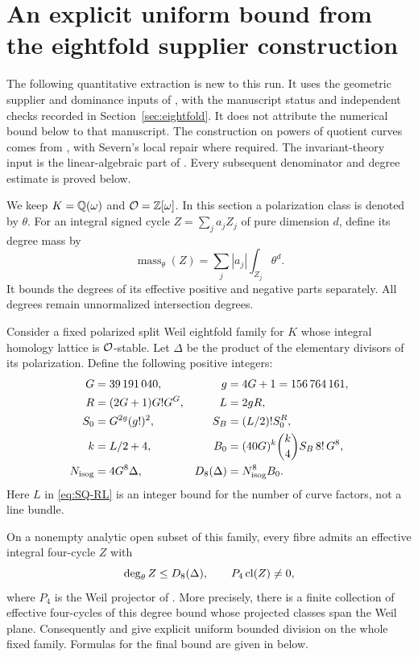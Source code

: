 \section{An explicit uniform bound from the eightfold supplier construction}
\label{sec:eightfold-quantitative}

The following quantitative extraction is new to this run. It uses the geometric supplier and dominance inputs of \citet{Severn26}, with the manuscript status and independent checks recorded in Section~\ref{sec:eightfold}. It does not attribute the numerical bound below to that manuscript. The construction on powers of quotient curves comes from \citet[Theorem~2.0 and Lemmas~2.3--2.6]{Schoen88}, with Severn's local repair where required. The invariant-theory input is the linear-algebraic part of \citet[Lemma~3.5, Proposition~3.6, and Remark~3.7]{Milne99}. Every subsequent denominator and degree estimate is proved below.

We keep $K=\mathbb Q(\omega)$ and $\mathcal O=\mathbb Z[\omega]$. In this section a polarization class is denoted by $\theta$. For an integral signed cycle $Z=\sum_j a_jZ_j$ of pure dimension $d$, define its degree mass by
\[
 \operatorname{mass}_\theta(Z)=\sum_j|a_j|\int_{Z_j}\theta^d.
\]
It bounds the degrees of its effective positive and negative parts separately. All degrees remain unnormalized intersection degrees.

\begin{theorem}\label{SQ1}
Consider a fixed polarized split Weil eightfold family for $K$ whose integral homology lattice is $\mathcal O$-stable. Let $\Delta$ be the product of the elementary divisors of its polarization. Define the following positive integers:
\begin{align}
 G&=39\,191\,040, & g&=4G+1=156\,764\,161,\label{eq:SQ-Gg}\\
 R&=(2G+1)G!G^G, & L&=2gR,\label{eq:SQ-RL}\\
 S_0&=G^{2g}(g!)^2, & S_B&=(L/2)!S_0^R,\label{eq:SQ-S}\\
 k&=L/2+4, & B_0&=(40G)^k\binom{k}{4}S_B\,8!\,G^8,\label{eq:SQ-B}\\
 N_{\rm isog}&=4G^8\Delta, & D_8(\Delta)&=N_{\rm isog}^{8}B_0.\label{eq:SQ-D}
\end{align}
Here $L$ in \eqref{eq:SQ-RL} is an integer bound for the number of curve factors, not a line bundle.

On a nonempty analytic open subset of this family, every fibre admits an effective integral four-cycle $Z$ with
\[
 \deg_\theta Z\le D_8(\Delta),\qquad P_4\operatorname{cl}(Z)\ne0,
\]
where $P_4$ is the Weil projector of . More precisely, there is a finite collection of effective four-cycles of this degree bound whose projected classes span the Weil plane. Consequently  and  give explicit uniform bounded division on the whole fixed family. Formulas for the final bound are given in  below.
\end{theorem}

